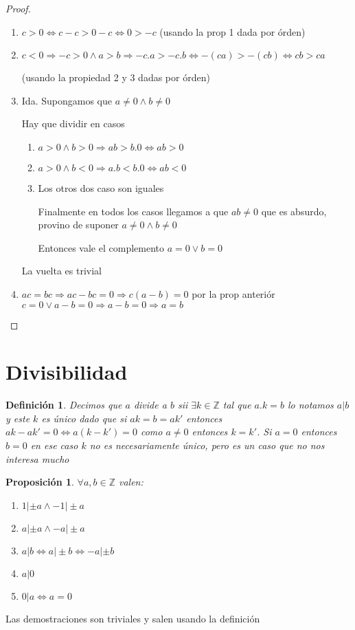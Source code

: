\documentclass{article}
\theoremstyle{break}
\newtheorem{proposition}{Proposición}
\newtheorem{definition}{Definición}[section]
\def \Z{\mathbb{Z}}
\begin{document}
    \begin{proof}
        \begin{enumerate}
            \item $c>0 \iff c -c  > 0 -c \iff 0 > -c$ (usando la prop 1 dada por órden)
            \item $c<0 \Rightarrow -c >0 \land a > b\Rightarrow -c.a > -c.b \iff -(ca) > -(cb) \iff cb > ca$ 
            

            (usando la propiedad 2 y 3 dadas por órden)
            \item Ida. Supongamos que $a\neq 0 \land b\neq 0$
            
            Hay que dividir en casos \begin{enumerate}
                \item $a>0 \land b>0 \Rightarrow ab > b.0 \iff ab>0$
                \item $a>0 \land b<0 \Rightarrow a.b < b.0 \iff ab < 0$
                \item Los otros dos caso son iguales
            
                Finalmente en todos los casos llegamos a que $ab \neq 0$ que es absurdo, provino de suponer $a\neq 0 \land b\neq 0$

                Entonces vale el complemento $a=0 \lor b=0$
            \end{enumerate}

            La vuelta es trivial
            \item $ac = bc \Rightarrow ac -bc = 0 \Rightarrow c(a-b) = 0$ por la prop anteriór 
            $c= 0 \lor a-b=0 \Rightarrow a-b = 0 \Rightarrow a=b$
        \end{enumerate}    
    \end{proof}

    \section{Divisibilidad}
    \begin{definition}
        Decimos que $a$ divide a $b$ sii $\exists k\in \Z$ tal que $a.k = b $ lo notamos $a|b$ y este $k$ es único dado que si $ak =b =ak'$
        entonces $ak -ak' =0 \iff a(k-k') = 0 $ como $a\neq 0$ entonces $k=k'$. Si $a=0$ entonces $b=0$ en ese caso $k$
        no es necesariamente único, pero es un caso que no nos interesa mucho
    \end{definition}

    \begin{proposition}
        $\forall a,b \in \Z$ valen:
        \begin{enumerate}
            \item $1|\pm a \land -1|\pm a$
            \item $a|\pm a \land -a|\pm a$
            \item $a|b \iff a|\pm b \iff -a | \pm b$
            \item $a|0$
            \item $0|a \iff a = 0 $
        \end{enumerate}
    \end{proposition}
    Las demostraciones son triviales y salen usando la definición
\end{document}
